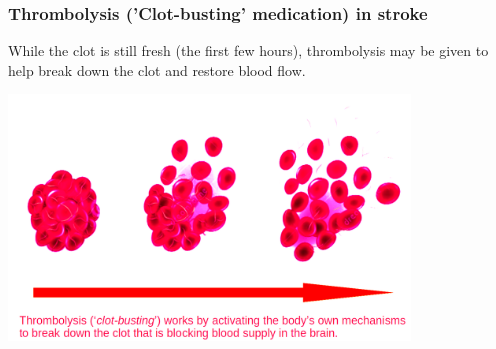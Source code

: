 \begin{frame}
\frametitle{Thrombolysis ('Clot-busting' medication) in stroke}

While the clot is still fresh (the first few hours), thrombolysis may be given to help break down the clot and restore blood flow.

\begin{center}
\includegraphics[width=0.8\textwidth]{./images/thrombolysis_mechanism}
\end{center}


\end{frame}